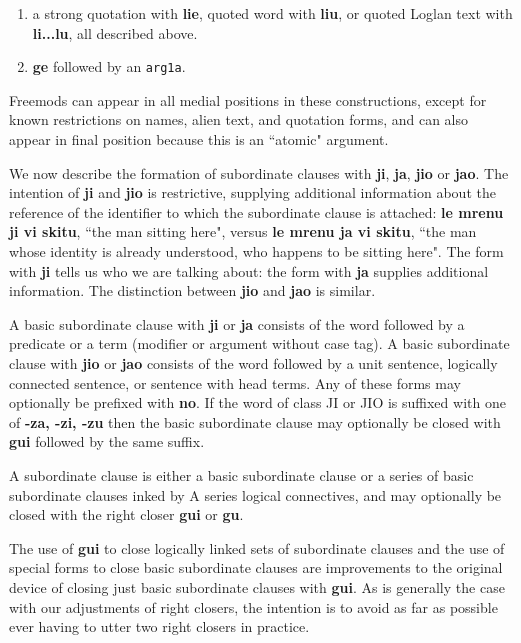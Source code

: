 \documentclass[12pt]{book}
\begin{document}
{\begin{enumerate}
\item  a strong quotation with {\bf lie}, quoted word with {\bf liu}, or quoted Loglan text with {\bf li...lu}, all described above.

\item {\bf ge} followed by an {\tt arg1a}.


\end{enumerate}

Freemods can appear in all medial positions in these constructions, except for known restrictions on names, alien text, and quotation forms, and can also appear in final position
because this is an ``atomic" argument.

We now describe the formation of subordinate clauses with {\bf ji}, {\bf ja}, {\bf jio} or {\bf jao}.  The intention of {\bf ji} and {\bf jio} is restrictive, supplying additional information about the reference of the identifier to which the subordinate clause is attached:  {\bf le mrenu ji vi skitu}, ``the man sitting here",
versus {\bf le mrenu ja vi skitu}, ``the man whose identity is already understood, who happens to be sitting here".  The form with {\bf ji} tells us who we are talking about:  the form with {\bf ja} supplies additional information.  The distinction between {\bf jio} and {\bf jao} is similar.

A basic subordinate clause with {\bf ji} or {\bf ja} consists of the word followed by a predicate or a term (modifier or argument without case tag).   A basic subordinate clause with {\bf jio} or {\bf jao} consists of the word followed by a unit sentence, logically connected sentence, or sentence with head terms.  Any of these forms may optionally be prefixed with {\bf no}.  If the word of class JI or JIO is suffixed with one of {\bf -za, -zi, -zu}
then the basic subordinate clause may optionally be closed with {\bf gui} followed by the same suffix.

A subordinate clause is either a basic subordinate clause or a series of basic subordinate clauses inked by A series logical connectives, and may optionally be closed with the right closer {\bf gui} or {\bf gu}.  

The use of {\bf gui} to close logically linked sets of subordinate clauses and the use of special forms to close basic subordinate clauses are improvements to the original device of closing just basic subordinate clauses with {\bf gui}.  As is generally the case with our adjustments of right closers, the intention is to avoid as far as possible ever having to utter two right closers in practice.

}
\end{document}
